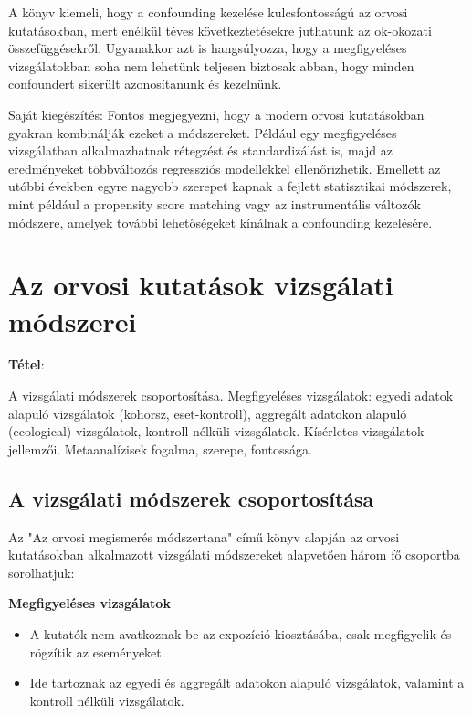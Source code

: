 \documentclass[a4paper,12pt]{article}
\begin{document}
    A könyv kiemeli, hogy a confounding kezelése kulcsfontosságú az orvosi kutatásokban, mert enélkül téves következtetésekre juthatunk az ok-okozati összefüggésekről. Ugyanakkor azt is hangsúlyozza, hogy a megfigyeléses vizsgálatokban soha nem lehetünk teljesen biztosak abban, hogy minden confoundert sikerült azonosítanunk és kezelnünk.

    Saját kiegészítés: Fontos megjegyezni, hogy a modern orvosi kutatásokban gyakran kombinálják ezeket a módszereket. Például egy megfigyeléses vizsgálatban alkalmazhatnak rétegzést és standardizálást is, majd az eredményeket többváltozós regressziós modellekkel ellenőrizhetik. Emellett az utóbbi években egyre nagyobb szerepet kapnak a fejlett statisztikai módszerek, mint például a propensity score matching vagy az instrumentális változók módszere, amelyek további lehetőségeket kínálnak a confounding kezelésére.


    \newpage


    \section{Az orvosi kutatások vizsgálati módszerei}

    \textbf{Tétel}:

    A vizsgálati módszerek csoportosítása. Megfigyeléses vizsgálatok: egyedi adatok alapuló
    vizsgálatok (kohorsz, eset-kontroll), aggregált adatokon alapuló (ecological) vizsgálatok,
    kontroll nélküli vizsgálatok. Kísérletes vizsgálatok jellemzői. Metaanalízisek fogalma, szerepe,
    fontossága.

    \subsection{A vizsgálati módszerek csoportosítása}

    Az "Az orvosi megismerés módszertana" című könyv alapján az orvosi kutatásokban alkalmazott vizsgálati módszereket alapvetően három fő csoportba sorolhatjuk:

    \textbf{Megfigyeléses vizsgálatok}
    \begin{itemize}
        \item A kutatók nem avatkoznak be az expozíció kiosztásába, csak megfigyelik és rögzítik az eseményeket.
        \item Ide tartoznak az egyedi és aggregált adatokon alapuló vizsgálatok, valamint a kontroll nélküli vizsgálatok.
    \end{itemize}
\end{document}

